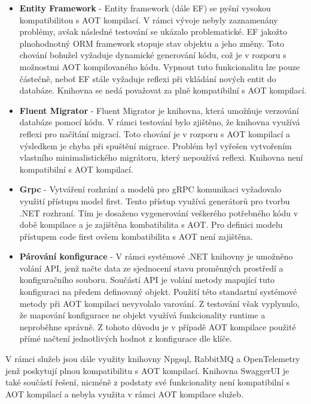 \begin{itemize}
  \item \textbf{Entity Framework} - Entity framework (dále EF) se pyšní vysokou kompatibilitou s AOT kompilací. V rámci vývoje nebyly zaznamenány problémy, avšak následné testování se ukázalo problematické. EF jakožto plnohodnotný ORM framework stopuje stav objektu a jeho změny. Toto chování bohužel vyžaduje dynamické generování kódu, což je v rozporu s možnostmi AOT kompilovaného kódu. Vypnout tuto funkcionalitu lze pouze částečně, neboť EF stále vyžaduje reflexi při vkládání nových entit do databáze. Knihovna se nedá považovat za plně kompatibilní s AOT kompilací.
  \item \textbf{Fluent Migrator} - Fluent Migrator je knihovna, která umožňuje verzování databáze pomocí kódu. V rámci testování bylo zjištěno, že knihovna využívá reflexi pro načítání migrací. Toto chování je v rozporu s AOT kompilací a výsledkem je chyba při spuštění migrace. Problém byl vyřešen vytvořením vlastního minimalistického migrátoru, který nepoužívá reflexi. Knihovna není kompatibilní s AOT kompilací.
  \item \textbf{Grpc} - Vytváření rozhrání a modelů pro gRPC komunikaci vyžadovalo využití přístupu model first. Tento přístup využívá generátorů pro tvorbu .NET rozhraní. Tím je dosaženo vygenerování veškerého potřebného kódu v době kompilace a je zajištěna kombatibilita s AOT. Pro definici modelu přístupem code first ovšem kombatibilita s AOT není zajištěna.
  \item \textbf{Párování konfigurace} - V rámci systémové .NET knihovny je umožněno volání API, jenž načte data ze sjednocení stavu proměnných prostředí a konfiguračního souboru. Součástí API je volání metody mapující tuto konfiguraci na předem definovaný objekt. Použití této standartní systémové metody při AOT kompilaci nevyvolalo varování. Z testování však vyplynulo, že mapování konfigurace ne objekt využívá funkcionality runtime a neproběhne správně. Z tohoto důvodu je v případě AOT kompilace použité přímé načtení jednotlivých hodnot z konfigurace dle klíče.
\end{itemize}

V rámci služeb jsou dále využity knihovny Npgsql, RabbitMQ a OpenTelemetry jenž poskytují plnou kompatibilitu s AOT kompilací. Knihovna SwaggerUI je také součástí řešení, nicméně z podstaty své funkcionality není kompatibilní s AOT kompilací a nebyla využita v rámci AOT kompilace služeb.


